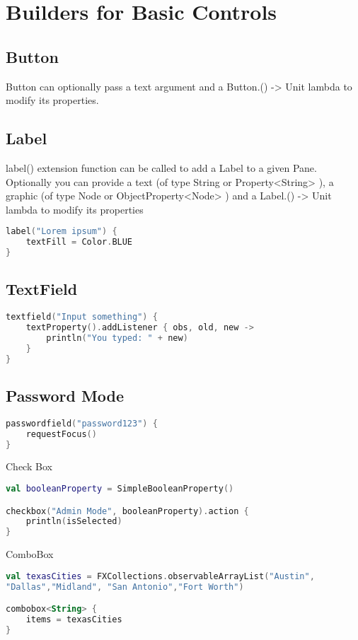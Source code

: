 \documentclass[12pt]{article}
\begin{document}
\section{Builders for Basic Controls}
\subsection{Button}
Button can optionally pass a text argument and a Button.() -> Unit lambda to modify its properties.
\subsection{Label}
label() extension function can be called to add a Label to a given Pane. Optionally you can provide a text (of type String or Property<String> ), a graphic (of type Node or ObjectProperty<Node> ) and a Label.() -> Unit lambda to modify its properties 
\begin{lstlisting}[language=Kotlin]
label("Lorem ipsum") {
	textFill = Color.BLUE
}
\end{lstlisting}
\subsection{TextField}
\begin{lstlisting}[language=Kotlin]
textfield("Input something") {
	textProperty().addListener { obs, old, new ->
		println("You typed: " + new)
	}
}
\end{lstlisting}
\subsection{Password Mode}
\begin{lstlisting}[language=Kotlin]
passwordfield("password123") {
	requestFocus()
}
\end{lstlisting}
Check Box
\begin{lstlisting}[language=Kotlin]
val booleanProperty = SimpleBooleanProperty()

checkbox("Admin Mode", booleanProperty).action {
	println(isSelected)
}
\end{lstlisting}
ComboBox

\begin{lstlisting}[language=Kotlin]
val texasCities = FXCollections.observableArrayList("Austin",
"Dallas","Midland", "San Antonio","Fort Worth")

combobox<String> {
	items = texasCities
}
\end{lstlisting}
\end{document}
